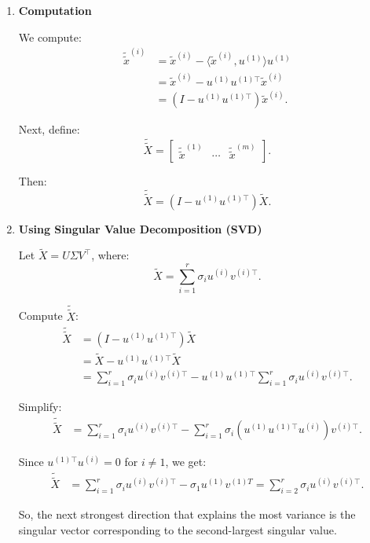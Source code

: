 \begin{example}
\begin{enumerate}
        \begin{enumerate}
            \item \textbf{Computation}

            We compute:
            \begin{align*}
            \tilde{\tilde{x}}^{(i)} &= \tilde{x}^{(i)} - \langle \tilde{x}^{(i)}, u^{(1)} \rangle u^{(1)} \\
            &= \tilde{x}^{(i)} - u^{(1)} u^{(1)\top} \tilde{x}^{(i)} \\
            &= \left(I - u^{(1)} u^{(1)\top} \right) \tilde{x}^{(i)}.
            \end{align*}
    
            Next, define:
            \[
            \tilde{\tilde{X}} = 
            \begin{bmatrix}
            \tilde{\tilde{x}}^{(1)} & \cdots & \tilde{\tilde{x}}^{(m)}
            \end{bmatrix}.
            \]
    
            Then:
            \[
            \tilde{\tilde{X}} = \left(I - u^{(1)} u^{(1)\top} \right) \tilde{X}.
            \]
    
            \item \textbf{Using Singular Value Decomposition (SVD)}
    
            Let \(\tilde{X} = U \Sigma V^\top\), where:
            \[
            \tilde{X} = \sum_{i=1}^r \sigma_i u^{(i)} v^{(i)\top}.
            \]
    
            Compute \( \tilde{\tilde{X}} \):
            \begin{align*}
            \tilde{\tilde{X}} &= \left(I - u^{(1)} u^{(1)\top} \right) \tilde{X} \\
            &= \tilde{X} - u^{(1)} u^{(1)\top} \tilde{X} \\
            &= \sum_{i=1}^r \sigma_i u^{(i)} v^{(i)\top} - u^{(1)} u^{(1)\top} \sum_{i=1}^r \sigma_i u^{(i)} v^{(i)\top}.
            \end{align*}
    
            Simplify:
            \begin{align*}
            \tilde{\tilde{X}} &= \sum_{i=1}^r \sigma_i u^{(i)} v^{(i)\top} - \sum_{i=1}^r \sigma_i \left(u^{(1)} u^{(1)\top} u^{(i)} \right) v^{(i)\top}.
            \end{align*}
    
            Since \(u^{(1)\top} u^{(i)} = 0\) for \(i \neq 1\), we get:
            \begin{align*}
            \tilde{\tilde{X}} &= \sum_{i=1}^r \sigma_i u^{(i)} v^{(i)\top} - \sigma_1 u^{(1)} v^{(1)T} = \sum_{i=2}^r \sigma_i u^{(i)} v^{(i)\top} .
            \end{align*}
    
            
            So, the next strongest direction that explains the most variance is the singular vector corresponding to the second-largest singular value.
        \end{enumerate}
    \end{enumerate}
\end{example}